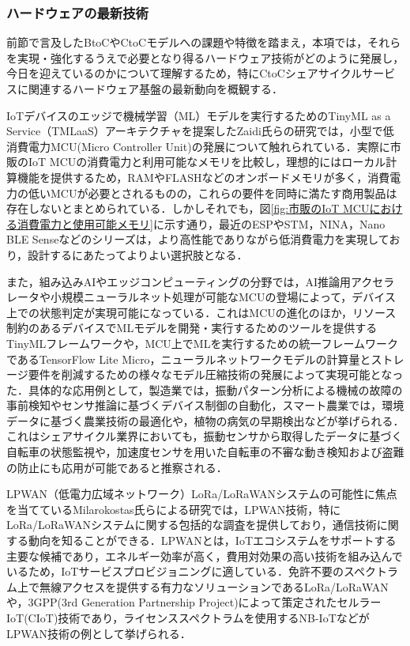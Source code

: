       \subsubsection{ハードウェアの最新技術}
        \label{sec:ハードウェアの最新技術}
          \par 前節で言及したBtoCやCtoCモデルへの課題や特徴を踏まえ，本項では，それらを実現・強化するうえで必要となり得るハードウェア技術がどのように発展し，今日を迎えているのかについて理解するため，特にCtoCシェアサイクルサービスに関連するハードウェア基盤の最新動向を概観する．
          \par IoTデバイスのエッジで機械学習（ML）モデルを実行するためのTinyML as a Service（TMLaaS）アーキテクチャを提案したZaidi氏らの研究では，小型で低消費電力MCU(Micro Controller Unit)の発展について触れられている．実際に市販のIoT MCUの消費電力と利用可能なメモリを比較し，理想的にはローカル計算機能を提供するため，RAMやFLASHなどのオンボードメモリが多く，消費電力の低いMCUが必要とされるものの，これらの要件を同時に満たす商用製品は存在しないとまとめられている．しかしそれでも，図\ref{fig:市販のIoT MCUにおける消費電力と使用可能メモリ}に示す通り，最近のESPやSTM，NINA，Nano BLE Senseなどのシリーズは，より高性能でありながら低消費電力を実現しており，設計するにあたってよりよい選択肢となる．
          \par また，組み込みAIやエッジコンピューティングの分野では，AI推論用アクセラレータや小規模ニューラルネット処理が可能なMCUの登場によって，デバイス上での状態判定が実現可能になっている．これはMCUの進化のほか，リソース制約のあるデバイスでMLモデルを開発・実行するためのツールを提供するTinyMLフレームワークや，MCU上でMLを実行するための統一フレームワークであるTensorFlow Lite Micro，ニューラルネットワークモデルの計算量とストレージ要件を削減するための様々なモデル圧縮技術の発展によって実現可能となった．具体的な応用例として，製造業では，振動パターン分析による機械の故障の事前検知やセンサ推論に基づくデバイス制御の自動化，スマート農業では，環境データに基づく農業技術の最適化や，植物の病気の早期検出などが挙げられる．これはシェアサイクル業界においても，振動センサから取得したデータに基づく自転車の状態監視や，加速度センサを用いた自転車の不審な動き検知および盗難の防止にも応用が可能であると推察される．
          \par LPWAN（低電力広域ネットワーク）LoRa/LoRaWANシステムの可能性に焦点を当てているMilarokostas氏らによる研究では，LPWAN技術，特にLoRa/LoRaWANシステムに関する包括的な調査を提供しており，通信技術に関する動向を知ることができる．LPWANとは，IoTエコシステムをサポートする主要な候補であり，エネルギー効率が高く，費用対効果の高い技術を組み込んでいるため，IoTサービスプロビジョニングに適している．免許不要のスペクトラム上で無線アクセスを提供する有力なソリューションであるLoRa/LoRaWANや，3GPP(3rd Generation Partnership Project)によって策定されたセルラーIoT(CIoT)技術であり，ライセンススペクトラムを使用するNB-IoTなどがLPWAN技術の例として挙げられる．
